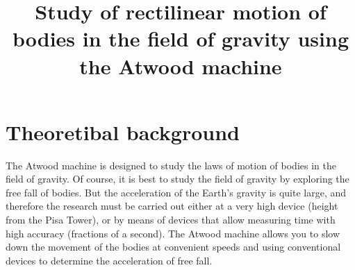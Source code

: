 \documentclass{LabWorkEng}
\title{Study of rectilinear motion of bodies in the field of gravity using the Atwood machine}
\begin{document}
\writedatatofile{\jobname}
\maketitle

\nocite{IrodovMechanics, BerkeleyMechanics, FLF1, Holyday}
\printbibliography

\section{Theoretibal background}

The Atwood machine is designed to study the laws of motion of bodies in the field of gravity. Of course, it is best to study the field of gravity by exploring the free fall of bodies. But the acceleration of the Earth's gravity is quite large, and therefore the research must be carried out either at a very high device (height from the Pisa Tower), or by means of devices that allow measuring time with high accuracy (fractions of a second). The Atwood machine allows you to slow down the movement of the bodies at convenient speeds and using conventional devices to determine the acceleration of free fall.
\end{document}
